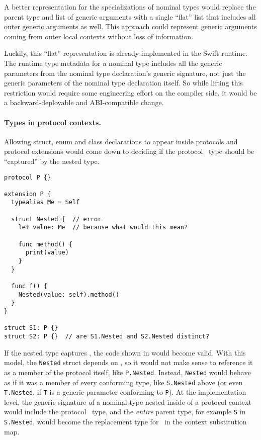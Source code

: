 \documentclass[../generics]{subfiles}
\begin{document}
A better representation for the specializations of nominal types would replace the parent type and list of generic arguments with a single ``flat'' list that includes all outer generic arguments as well. This approach could represent generic arguments coming from outer local contexts without loss of information.

Luckily, this ``flat'' representation is already implemented in the Swift runtime. The runtime type metadata for a nominal type includes all the generic parameters from the nominal type declaration's generic signature, not just the generic parameters of the nominal type declaration itself. So while lifting this restriction would require some engineering effort on the compiler side, it would be a backward-deployable and ABI-compatible change.

\paragraph{Types in protocol contexts.} Allowing struct, enum and class declarations to appear inside protocols and protocol extensions would come down to deciding if the \IndexSelf protocol \tSelf\ type should be ``captured'' by the nested type.

\begin{listing}\label{nominal type in protocol context}
\begin{Verbatim}
protocol P {}

extension P {
  typealias Me = Self

  struct Nested {  // error
    let value: Me  // because what would this mean?

    func method() {
      print(value)
    }
  }
  
  func f() {
    Nested(value: self).method()
  }
}

struct S1: P {}
struct S2: P {}  // are S1.Nested and S2.Nested distinct?
\end{Verbatim}
\end{listing}
If the nested type captures \tSelf, the code shown in  would become valid. With this model, the \texttt{Nested} struct depends on \tSelf, so it would not make sense to reference it as a member of the protocol itself, like \texttt{P.Nested}. Instead, \texttt{Nested} would behave as if it was a member of every conforming type, like \texttt{S.Nested} above (or even \texttt{T.Nested}, if \texttt{T} is a generic parameter conforming to \texttt{P}). At the implementation level, the generic signature of a nominal type nested inside of a protocol context would include the protocol \tSelf\ type, and the \emph{entire} parent type, for example \texttt{S} in \texttt{S.Nested}, would become the replacement type for \tSelf\ in the context substitution map.
\end{document}
